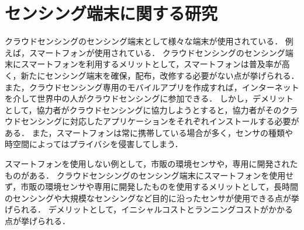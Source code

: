 \section{センシング端末に関する研究}
\label{sec:format_abst}
クラウドセンシングのセンシング端末として様々な端末が使用されている．
例えば，スマートフォンが使用されている\cite{ura}\cite{hoso}\cite{Tangmunarunkit}\cite{ohmage}\cite{Ferreira}\cite{AWARE}．
クラウドセンシングのセンシング端末にスマートフォンを利用するメリットとして，スマートフォンは普及率が高く，新たにセンシング端末を確保，配布，改修する必要がない点が挙げられる．
また，クラウドセンシング専用のモバイルアプリを作成すれば，インターネットを介して世界中の人がクラウドセンシングに参加できる．
しかし，デメリットとして，協力者がクラウドセンシングに協力しようとすると，協力者がそのクラウドセンシングに対応したアプリケーションをそれぞれインストールする必要がある．
また，スマートフォンは常に携帯している場合が多く，センサの種類や時空間によってはプライバシを侵害してしまう．

スマートフォンを使用しない例として，市販の環境センサや，専用に開発されたものがある\cite{paku}\cite{weko}\cite{amedas}\cite{S-net}．
クラウドセンシングのセンシング端末にスマートフォンを使用せず，市販の環境センサや専用に開発したものを使用するメリットとして，長時間のセンシングや大規模なセンシングなど目的に沿ったセンサが使用できる点が挙げられる．
デメリットとして，イニシャルコストとランニングコストがかかる点が挙げられる．



